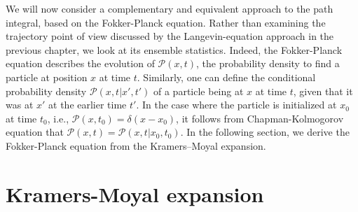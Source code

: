 We will now consider a complementary and equivalent approach to the path integral, based on the Fokker-Planck equation.
Rather than examining the trajectory point of view discussed by the Langevin-equation approach in the previous chapter,  we look at its ensemble statistics. Indeed, the Fokker-Planck equation describes the evolution of  $\mathcal{P}(x,t)$, the probability density to find a particle at position $x$ at time $t$. Similarly, one can define the conditional probability density $\mathcal{P}(x,t|x',t')$ of a particle being at $x$ at time $t$, given that it was at $x'$ at the earlier time $t'$. In the case where the particle is initialized at $x_0$ at time $t_0$, i.e., $\mathcal{P}(x,t_0)=\delta(x-x_0)$, it follows from Chapman-Kolmogorov equation that $\mathcal{P}(x,t)=\mathcal{P}(x,t|x_0,t_0)$.
In the following section, we derive the Fokker-Planck equation from the Kramers–Moyal expansion.

\section{Kramers-Moyal expansion}

